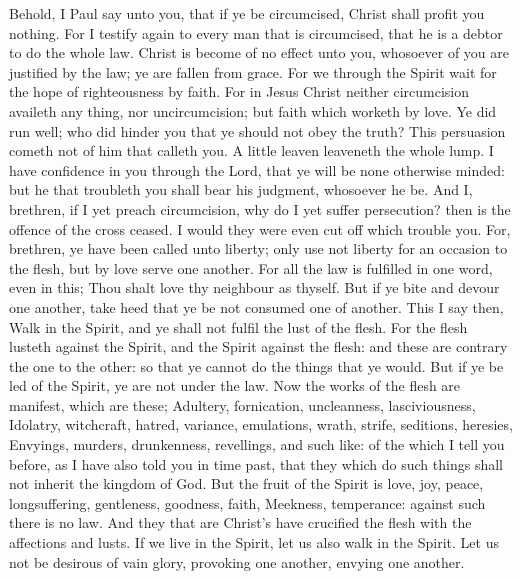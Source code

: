  Behold, I Paul say unto you, that if ye be circumcised,
Christ shall profit you nothing.  For I testify again to
every man that is circumcised, that he is a debtor to do the whole law.
 Christ is become of no effect unto you, whosoever of you
are justified by the law; ye are fallen from grace.  For
we through the Spirit wait for the hope of righteousness by faith.
 For in Jesus Christ neither circumcision availeth any
thing, nor uncircumcision; but faith which worketh by love.
 Ye did run well; who did hinder you that ye should not
obey the truth?  This persuasion cometh not of him that
calleth you.  A little leaven leaveneth the whole lump.
 I have confidence in you through the Lord, that ye will
be none otherwise minded: but he that troubleth you shall bear his
judgment, whosoever he be.  And I, brethren, if I yet
preach circumcision, why do I yet suffer persecution? then is the
offence of the cross ceased.  I would they were even cut
off which trouble you.  For, brethren, ye have been
called unto liberty; only use not liberty for an occasion to the flesh,
but by love serve one another.  For all the law is
fulfilled in one word, even in this; Thou shalt love thy neighbour as
thyself.  But if ye bite and devour one another, take
heed that ye be not consumed one of another.  This I say
then, Walk in the Spirit, and ye shall not fulfil the lust of the flesh.
 For the flesh lusteth against the Spirit, and the Spirit
against the flesh: and these are contrary the one to the other: so that
ye cannot do the things that ye would.  But if ye be led
of the Spirit, ye are not under the law.  Now the works
of the flesh are manifest, which are these; Adultery, fornication,
uncleanness, lasciviousness,  Idolatry, witchcraft,
hatred, variance, emulations, wrath, strife, seditions, heresies,
 Envyings, murders, drunkenness, revellings, and such
like: of the which I tell you before, as I have also told you in time
past, that they which do such things shall not inherit the kingdom of
God.  But the fruit of the Spirit is love, joy, peace,
longsuffering, gentleness, goodness, faith,  Meekness,
temperance: against such there is no law.  And they that
are Christ's have crucified the flesh with the affections and lusts.
 If we live in the Spirit, let us also walk in the
Spirit.  Let us not be desirous of vain glory, provoking
one another, envying one another.

